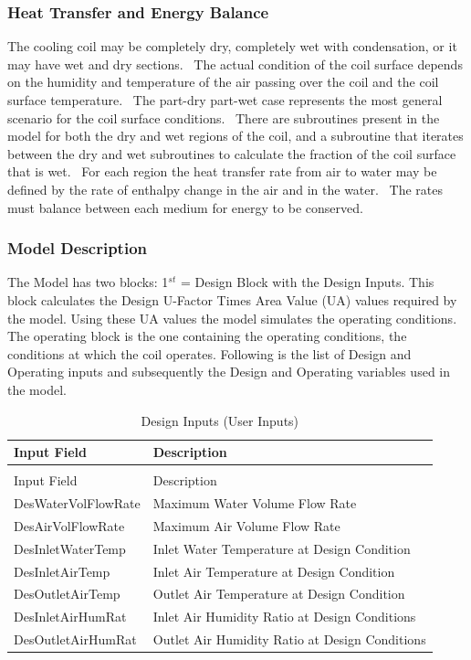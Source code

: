 \subsubsection{Heat Transfer and Energy Balance}\label{heat-transfer-and-energy-balance}

The cooling coil may be completely dry, completely wet with condensation, or it may have wet and dry sections.~ The actual condition of the coil surface depends on the humidity and temperature of the air passing over the coil and the coil surface temperature.~ The part-dry part-wet case represents the most general scenario for the coil surface conditions.~ There are subroutines present in the model for both the dry and wet regions of the coil, and a subroutine that iterates between the dry and wet subroutines to calculate the fraction of the coil surface that is wet.~ For each region the heat transfer rate from air to water may be defined by the rate of enthalpy change in the air and in the water.~ The rates must balance between each medium for energy to be conserved.

\subsubsection{Model Description}\label{model-description-007}

The Model has two blocks: 1\(^{st}\) = Design Block with the Design Inputs. This block calculates the Design U-Factor Times Area Value (UA) values required by the model. Using these UA values the model simulates the operating conditions.~ The operating block is the one containing the operating conditions, the conditions at which the coil operates. Following is the list of Design and Operating inputs and subsequently the Design and Operating variables used in the model.

\begin{longtable}[c]{p{1.79in}p{4.2in}}
\caption{Design Inputs (User Inputs) \label{table:design-inputs-user-inputs}} \tabularnewline
\toprule 
Input Field & Description \tabularnewline
\midrule
\endfirsthead

\caption[]{Design Inputs (User Inputs)} \tabularnewline
\toprule 
Input Field & Description \tabularnewline
\midrule
\endhead

DesWaterVolFlowRate & Maximum Water Volume Flow Rate \tabularnewline
DesAirVolFlowRate & Maximum Air Volume Flow Rate \tabularnewline
DesInletWaterTemp & Inlet Water Temperature at Design Condition \tabularnewline
DesInletAirTemp & Inlet Air Temperature at Design Condition \tabularnewline
DesOutletAirTemp & Outlet Air Temperature at Design Condition \tabularnewline
DesInletAirHumRat & Inlet Air Humidity Ratio at Design Conditions \tabularnewline
DesOutletAirHumRat & Outlet Air Humidity Ratio at Design Conditions \tabularnewline
\bottomrule
\end{longtable}


